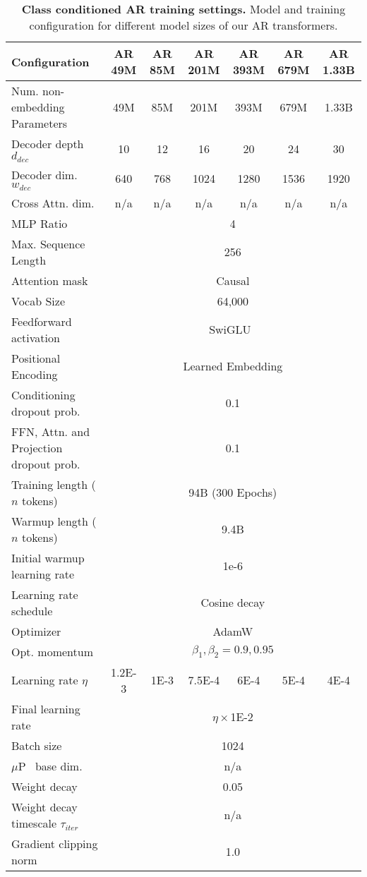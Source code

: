 \begin{table}[h!]
    \caption{\textbf{Class conditioned AR training settings.} Model and training configuration for different model sizes of our AR transformers.}
    \label{tab:app_c2i_ar_training_settings}
    \centering
    \begin{adjustbox}{max width=\linewidth}
    \begin{tabular}{@{}l|cccccc@{}}
    \toprule
    Configuration & AR 49M & AR 85M & AR 201M & AR 393M & AR 679M & AR 1.33B \\ 
    
    \midrule
    Num. non-embedding Parameters & 49M & 85M & 201M & 393M & 679M & 1.33B \\
    Decoder depth $d_{dec}$ & 10 & 12 & 16 & 20 & 24 & 30 \\
    Decoder dim. $w_{dec}$ & 640 & 768 & 1024 & 1280 & 1536 & 1920 \\
    Cross Attn. dim. & n/a & n/a & n/a & n/a & n/a & n/a \\
    MLP Ratio & \multicolumn{6}{c}{4} \\
    Max. Sequence Length & \multicolumn{6}{c}{256} \\ 
    Attention mask & \multicolumn{6}{c}{Causal} \\ 
    Vocab Size & \multicolumn{6}{c}{64,000} \\ 
    Feedforward activation & \multicolumn{6}{c}{SwiGLU~\cite{Shazeer2020GLU}} \\
    Positional Encoding & \multicolumn{6}{c}{Learned Embedding} \\
    Conditioning dropout prob. & \multicolumn{6}{c}{0.1} \\
    FFN, Attn. and Projection dropout prob. & \multicolumn{6}{c}{0.1} \\

    \midrule
    Training length ($n$ tokens) & \multicolumn{6}{c}{94B (300 Epochs)} \\ 
    Warmup length ($n$ tokens) & \multicolumn{6}{c}{9.4B} \\
    Initial warmup learning rate & \multicolumn{6}{c}{1e-6} \\
    Learning rate schedule & \multicolumn{6}{c}{Cosine decay} \\
    Optimizer & \multicolumn{6}{c}{AdamW \cite{Loshchilov2017AdamW}} \\
    Opt. momentum & \multicolumn{6}{c}{$\beta_1,\beta_2=0.9,0.95$} \\
    Learning rate $\eta$ & 1.2E-3 & 1E-3 & 7.5E-4 & 6E-4 &5E-4 & 4E-4 \\
    Final learning rate & \multicolumn{6}{c}{$\eta \times$1E-2} \\
    Batch size & \multicolumn{6}{c}{1024} \\
    $\mu$P~\cite{Yang2022muP} base dim. & \multicolumn{6}{c}{n/a} \\
    Weight decay & \multicolumn{6}{c}{0.05} \\
    Weight decay timescale $\tau_{iter}$~\cite{Wang2024AdamWWDEMA} & \multicolumn{6}{c}{n/a} \\
    Gradient clipping norm & \multicolumn{6}{c}{1.0} \\
    

\end{tabular}
\end{adjustbox}
\end{table}
